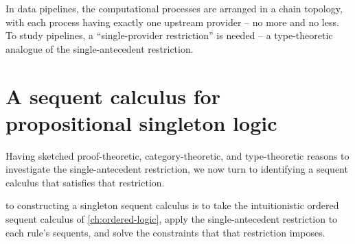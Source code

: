 \begin{description}[parsep=0pt, listparindent=\parindent]
  In data pipelines, the computational processes are arranged in a chain topology, with each process having exactly one upstream provider -- no more and no less.
  To study pipelines, a \enquote{single-provider restriction} is needed -- a type-theoretic analogue of the single-antecedent restriction.
\end{description}


\section{A sequent calculus for propositional singleton logic}\label{sec:singleton-logic:seq-calc}

Having sketched proof-theoretic, category-theoretic, and type-theoretic reasons to investigate the single-antecedent restriction, we now turn to identifying a sequent calculus that satisfies that restriction.





 to constructing a singleton sequent calculus is to take the intuitionistic ordered sequent calculus of \cref{ch:ordered-logic}, apply the single-antecedent restriction to each rule's sequents, and solve the constraints that that restriction imposes.

